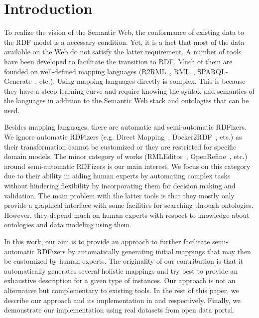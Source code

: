 \section{Introduction}

To realize the vision of the Semantic Web, the conformance of existing data to the RDF model is a necessary condition. Yet, it is a fact that most of the data available on the Web do not satisfy the latter requirement. A number of tools have been developed to facilitate the transition to RDF. Much of them are founded on well-defined mapping languages (R2RML~\cite{R2RML_W3C:12}, RML~\cite{dimou2014rml}, SPARQL-Generate~\cite{lefranccois2016flexible}, etc.). Using mapping languages directly is complex. This is because they have a steep learning curve and require knowing the syntax and semantics of the languages in addition to the Semantic Web stack and ontologies that can be used. 

Besides mapping languages, there are automatic and semi-automatic RDFizers. We ignore automatic RDFizers (e.g. Direct Mapping~\cite{Direct_Mapping_W3C:12}, Docker2RDF~\cite{ayed2017docker2rdf}, etc.) as their transformation cannot be customized or they are restricted for specific domain models. The minor category of works (RMLEditor~\cite{heyvaert2016rmleditor}, OpenRefine~\cite{verborgh2013using}, etc.) around semi-automatic RDFizers is our main interest. We focus on this category due to their ability in aiding human experts by automating complex tasks without hindering flexibility by incorporating them for decision making and validation. The main problem with the latter tools is that they mostly only provide a graphical interface with some facilities for searching through ontologies. However, they depend much on human experts with respect to knowledge about ontologies and data modeling using them.

In this work, our aim is to provide an approach to further facilitate semi-automatic RDFizers by automatically generating initial mappings that may then be customized by human experts. The originality of our contribution is that it automatically generates several holistic mappings and try best to provide an exhaustive description for a given type of instances. Our approach is not an alternative but complementary to existing tools. In the rest of this paper, we describe our approach and its implementation in  and  respectively. Finally, we demonstrate our implementation using real datasets from open data portal. %



